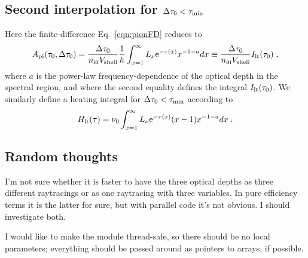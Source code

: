 \documentclass[a4paper,11pt]{article}
\begin{document}
\subsection{Second interpolation for $\Delta\tau_0<\tau_{\mathrm{min}}$}
Here the finite-difference Eq.~\ref{eqn:pionFD} reduces to 
\begin{equation}
A_{\mathrm{pi}}(\tau_0,\Delta\tau_0) = 
    \frac{\Delta\tau_0}{n_{\textsc{hi}}V_{\mathrm{shell}}} 
    \frac{1}{h} \int_{x=1}^{\infty}
    L_\nu \mathrm{e}^{-\tau(x)} x^{-1-a} dx
  \equiv \frac{\Delta\tau_0}{n_{\textsc{hi}}V_{\mathrm{shell}}} I_{\mathrm{lt}}(\tau_0) \;,
\label{eqn:pion_lowtau}
\end{equation}
where $a$ is the power-law frequency-dependence of the optical depth in the spectral region, and where the second equality defines the integral $I_{\mathrm{lt}}(\tau_0)$.
We similarly define a heating integral for $\Delta\tau_0<\tau_{\mathrm{min}}$ according to
\begin{equation}
H_{\mathrm{lt}}(\tau) = \nu_0\int_{x=1}^{\infty}
    L_\nu \mathrm{e}^{-\tau(x)}(x-1)x^{-1-a} dx \;.
\label{eqn:pheat_lowtau}
\end{equation}




\subsection{Random thoughts}
I'm not sure whether it is faster to have the three optical depths as three different raytracings or as one raytracing with three variables.
In pure efficiency terms it is the latter for sure, but with parallel code it's not obvious.
I should investigate both.

I would like to make the module thread-safe, so there should be no local parameters; everything should be passed around as pointers to arrays, if possible.


\end{document}
